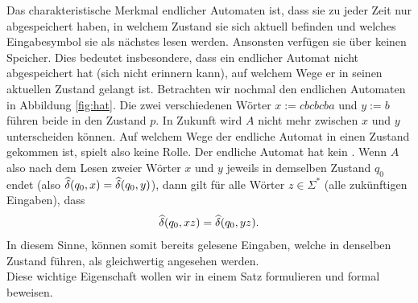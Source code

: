 \noindent
Das charakteristische Merkmal endlicher Automaten ist, dass sie zu jeder Zeit nur abgespeichert haben, in welchem Zustand sie sich aktuell befinden und welches Eingabesymbol sie als nächstes lesen werden. Ansonsten verfügen sie über keinen Speicher. Dies bedeutet insbesondere, dass ein endlicher Automat nicht abgespeichert hat (sich nicht erinnern kann), auf welchem Wege er in seinen aktuellen Zustand gelangt ist. Betrachten wir nochmal den endlichen Automaten in Abbildung \cref{fig:hat}. Die zwei verschiedenen Wörter $x:= cbcbcba$ und $y := b$ führen beide in den Zustand $p$. In Zukunft wird $A$ nicht mehr zwischen $x$ und $y$ unterscheiden können. Auf welchem Wege der endliche Automat in einen Zustand gekommen ist, spielt also keine Rolle. Der endliche Automat hat kein . Wenn $A$ also nach dem Lesen zweier Wörter $x$ und $y$ jeweils in demselben Zustand $q_0$ endet (also $\widehat{\delta}(q_0,x) = \widehat{\delta}(q_0,y)$), dann gilt für alle Wörter $z\in\Sigma^*$ (alle zukünftigen Eingaben), dass
\begin{align*}
	\widehat{\delta}(q_0,xz) = \widehat{\delta}(q_0,yz).
\end{align*}
In diesem Sinne, können somit bereits gelesene Eingaben, welche in denselben Zustand führen, als gleichwertig angesehen werden.\\
Diese wichtige Eigenschaft wollen wir in einem Satz formulieren und formal beweisen.

